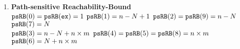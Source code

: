 \begin{enumerate}
\begin{itemize}
\end{itemize}
\item \textbf{Path-sensitive Reachability-Bound}
\\
$\mathtt{psRB}(0) = \mathtt{psRB}(\mathtt{ex}) = 1$ \quad
$\mathtt{psRB}(1) = n - N + 1$ \quad
$\mathtt{psRB}(2) = \mathtt{psRB}(9) = n - N$ \quad
$\mathtt{psRB}(7) = N$
\\
$\mathtt{psRB}(3) = n - N + n \times m$ \quad
$\mathtt{psRB}(4) = \mathtt{psRB}(5) = \mathtt{psRB}(8) = n \times m$ \quad
$\mathtt{psRB}(6) = N + n \times m$ 
\end{enumerate}